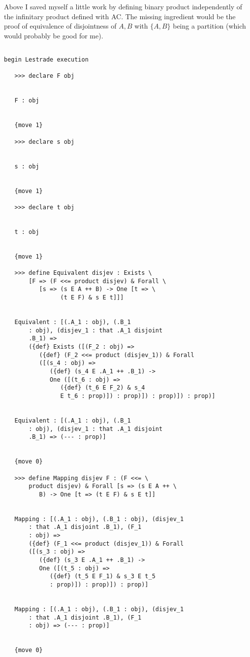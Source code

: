 \documentclass[12pt]{article}
\begin{document}
Above I saved myself a little work by defining binary product independently of the infinitary product defined with AC.  The missing ingredient would be the proof of equivalence
of disjointness of $A,B$ with $\{A,B\}$ being a partition (which would probably be good for me).

\begin{verbatim}

begin Lestrade execution

   >>> declare F obj


   F : obj


   {move 1}

   >>> declare s obj


   s : obj


   {move 1}

   >>> declare t obj


   t : obj


   {move 1}

   >>> define Equivalent disjev : Exists \
       [F => (F <<= product disjev) & Forall \
          [s => (s E A ++ B) -> One [t => \
                (t E F) & s E t]]]


   Equivalent : [(.A_1 : obj), (.B_1 
       : obj), (disjev_1 : that .A_1 disjoint 
       .B_1) => 
       ({def} Exists ([(F_2 : obj) => 
          ({def} (F_2 <<= product (disjev_1)) & Forall 
          ([(s_4 : obj) => 
             ({def} (s_4 E .A_1 ++ .B_1) -> 
             One ([(t_6 : obj) => 
                ({def} (t_6 E F_2) & s_4 
                E t_6 : prop)]) : prop)]) : prop)]) : prop)]


   Equivalent : [(.A_1 : obj), (.B_1 
       : obj), (disjev_1 : that .A_1 disjoint 
       .B_1) => (--- : prop)]


   {move 0}

   >>> define Mapping disjev F : (F <<= \
       product disjev) & Forall [s => (s E A ++ \
          B) -> One [t => (t E F) & s E t]]


   Mapping : [(.A_1 : obj), (.B_1 : obj), (disjev_1 
       : that .A_1 disjoint .B_1), (F_1 
       : obj) => 
       ({def} (F_1 <<= product (disjev_1)) & Forall 
       ([(s_3 : obj) => 
          ({def} (s_3 E .A_1 ++ .B_1) -> 
          One ([(t_5 : obj) => 
             ({def} (t_5 E F_1) & s_3 E t_5 
             : prop)]) : prop)]) : prop)]


   Mapping : [(.A_1 : obj), (.B_1 : obj), (disjev_1 
       : that .A_1 disjoint .B_1), (F_1 
       : obj) => (--- : prop)]


   {move 0}


\end{verbatim}
\end{document}
